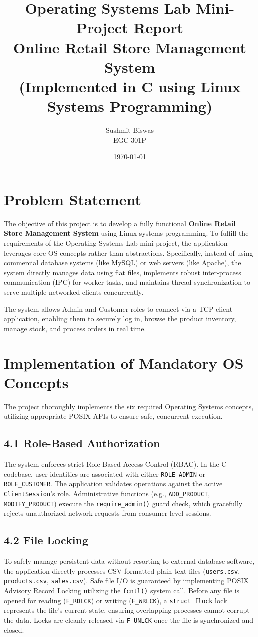 \documentclass[12pt,a4paper]{article}
\title{\textbf{Operating Systems Lab Mini-Project Report}\\
\large Online Retail Store Management System\\
\small (Implemented in C using Linux Systems Programming)}
\author{Sushmit Biswas \\ EGC 301P}
\date{\today}
\begin{document}
\maketitle

\section{Problem Statement}
The objective of this project is to develop a fully functional \textbf{Online Retail Store Management System} using Linux systems programming. To fulfill the requirements of the Operating Systems Lab mini-project, the application leverages core OS concepts rather than abstractions. Specifically, instead of using commercial database systems (like MySQL) or web servers (like Apache), the system directly manages data using flat files, implements robust inter-process communication (IPC) for worker tasks, and maintains thread synchronization to serve multiple networked clients concurrently.

The system allows Admin and Customer roles to connect via a TCP client application, enabling them to securely log in, browse the product inventory, manage stock, and process orders in real time.

\section{Implementation of Mandatory OS Concepts}
The project thoroughly implements the six required Operating Systems concepts, utilizing appropriate POSIX APIs to ensure safe, concurrent execution.

\subsection{4.1 Role-Based Authorization}
The system enforces strict Role-Based Access Control (RBAC). In the C codebase, user identities are associated with either \texttt{ROLE\_ADMIN} or \texttt{ROLE\_CUSTOMER}. 
The application validates operations against the active \texttt{ClientSession}'s role. Administrative functions (e.g., \texttt{ADD\_PRODUCT}, \texttt{MODIFY\_PRODUCT}) execute the \texttt{require\_admin()} guard check, which gracefully rejects unauthorized network requests from consumer-level sessions.

\subsection{4.2 File Locking}
To safely manage persistent data without resorting to external database software, the application directly processes CSV-formatted plain text files (\texttt{users.csv}, \texttt{products.csv}, \texttt{sales.csv}). 
Safe file I/O is guaranteed by implementing POSIX Advisory Record Locking utilizing the \texttt{fcntl()} system call. 
Before any file is opened for reading (\texttt{F\_RDLCK}) or writing (\texttt{F\_WRLCK}), a \texttt{struct flock} lock represents the file's current state, ensuring overlapping processes cannot corrupt the data. Locks are cleanly released via \texttt{F\_UNLCK} once the file is synchronized and closed.
\end{document}
